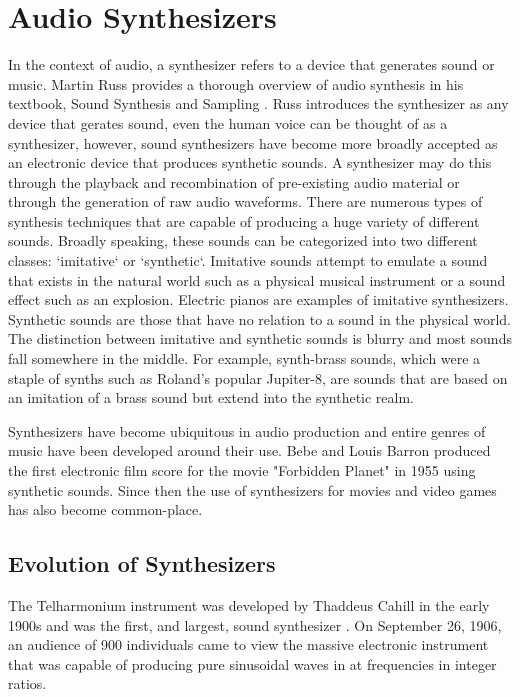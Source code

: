 \section{Audio Synthesizers}
In the context of audio, a synthesizer refers to a device that generates sound or music. Martin Russ provides a thorough overview of audio synthesis in his textbook, Sound Synthesis and Sampling \cite{russ2012sound}. Russ introduces the synthesizer as any device that gerates sound,  even the human voice can be thought of as a synthesizer, however, sound synthesizers have become more broadly accepted as an electronic device that produces synthetic sounds. A synthesizer may do this through the playback and recombination of pre-existing audio material or through the generation of raw audio waveforms. There are numerous types of synthesis techniques that are capable of producing a huge variety of different sounds. Broadly speaking, these sounds can be categorized into two different classes: `imitative` or `synthetic`. Imitative sounds attempt to emulate a sound that exists in the natural world such as a physical musical instrument or a sound effect such as an explosion. Electric pianos are examples of imitative synthesizers. Synthetic sounds are those that have no relation to a sound in the physical world. The distinction between imitative and synthetic sounds is blurry and most sounds fall somewhere in the middle. For example, synth-brass sounds, which were a staple of synths such as Roland's popular Jupiter-8, are sounds that are based on an imitation of a brass sound but extend into the synthetic realm. 

Synthesizers have become ubiquitous in audio production and entire genres of music have been developed around their use. Bebe and Louis Barron produced the first electronic film score for the movie "Forbidden Planet" in 1955 using synthetic sounds. Since then the use of synthesizers for movies and video games has also become common-place.


\subsection{Evolution of Synthesizers}
The Telharmonium instrument was developed by Thaddeus Cahill in the early 1900s and was the first, and largest, sound synthesizer \cite{roads1996computer}. On September 26, 1906, an audience of 900 individuals came to view the massive electronic instrument that was capable of producing pure sinusoidal waves in at frequencies in integer ratios. 

